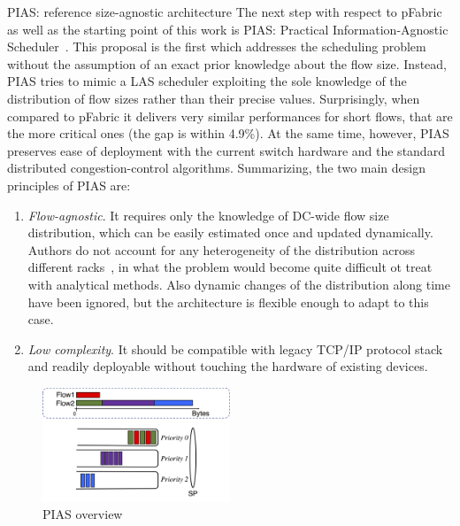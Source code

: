 \begin{subsection}{PIAS: reference size-agnostic architecture}
	\label{sec:pias}
	The next step with respect to pFabric as well as the starting point of this work is PIAS: Practical Information-Agnostic Scheduler~\cite{pias}. This proposal is the first which addresses the scheduling problem without the assumption of an exact prior knowledge about the flow size. Instead, PIAS tries to mimic a LAS scheduler exploiting the sole knowledge of the distribution of flow sizes rather than their precise values. Surprisingly, when compared to pFabric it delivers very similar performances for short flows, that are the more critical ones (the gap is within 4.9\%). At the same time, however, PIAS preserves ease of deployment with the current switch hardware and the standard distributed congestion-control algorithms.
	Summarizing, the two main design principles of PIAS are:
	
	\begin{enumerate}
		\item \textit{Flow-agnostic}. It requires only the knowledge of DC-wide flow size distribution, which can be easily estimated once and updated dynamically. Authors do not account for any heterogeneity of the distribution across different racks~\cite{facebook_dcn}, in what the problem would become quite difficult ot treat with analytical methods. Also dynamic changes of the distribution along time have been ignored, but the architecture is flexible enough to adapt to this case.
		\item \textit{Low complexity}. It should be compatible with legacy TCP/IP protocol stack and readily deployable without touching the hardware of existing devices.
	\end{enumerate}

	\begin{figure}
		\centering
		\includegraphics[width=0.5\textwidth]{Chapter2/Figures/pias_scheme}
		\caption{PIAS overview}
		\label{fig:pias_scheme}
	\end{figure}


\end{subsection}
